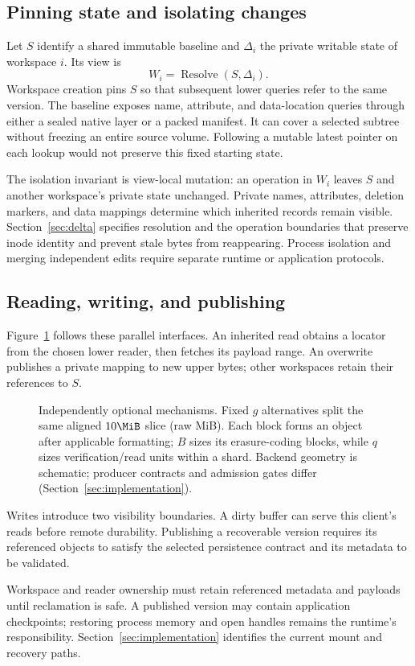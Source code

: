 \subsection{Pinning state and isolating changes}

Let $S$ identify a shared immutable baseline and $\Delta_i$ the private
writable state of workspace $i$. Its view is
\begin{equation}
  W_i = \operatorname{Resolve}(S,\Delta_i).
\end{equation}
Workspace creation pins $S$ so that subsequent lower queries refer to the
same version. The baseline exposes name, attribute, and data-location
queries through either a sealed native layer or a packed manifest.
It can cover a selected subtree without freezing an entire source volume.
Following a mutable latest pointer on each lookup would not preserve
this fixed starting state.

The isolation invariant is view-local mutation: an operation in $W_i$
leaves $S$ and another workspace's private state unchanged. Private names,
attributes, deletion markers, and data mappings determine which inherited
records remain visible. Section~\ref{sec:delta} specifies resolution and
the operation boundaries that preserve inode identity and prevent stale
bytes from reappearing. Process isolation and merging independent edits
require separate runtime or application protocols.

\subsection{Reading, writing, and publishing}

Figure~\ref{fig:overview} follows these parallel interfaces. An inherited
read obtains a locator from the chosen lower reader, then fetches its
payload range. An overwrite publishes a private mapping to new upper
bytes; other workspaces retain their references to $S$.

\begin{figure}[!t]
\centering

\caption{Independently optional mechanisms. Fixed $g$ alternatives split
the same aligned $10\MiB$ slice (raw MiB). Each block forms an object after
applicable formatting; $B$ sizes its erasure-coding blocks, while $q$ sizes
verification/read units within a shard. Backend geometry is schematic;
producer contracts and admission gates differ
(Section~\ref{sec:implementation}).}
\label{fig:overview}
\end{figure}

Writes introduce two visibility boundaries. A dirty buffer can serve
this client's reads before remote durability. Publishing a recoverable
version requires its referenced objects to satisfy the selected
persistence contract and its metadata to be validated.

Workspace and reader ownership must retain referenced metadata and
payloads until reclamation is safe. A published version may contain
application checkpoints; restoring process memory and open handles
remains the runtime's responsibility. Section~\ref{sec:implementation}
identifies the current mount and recovery paths.

